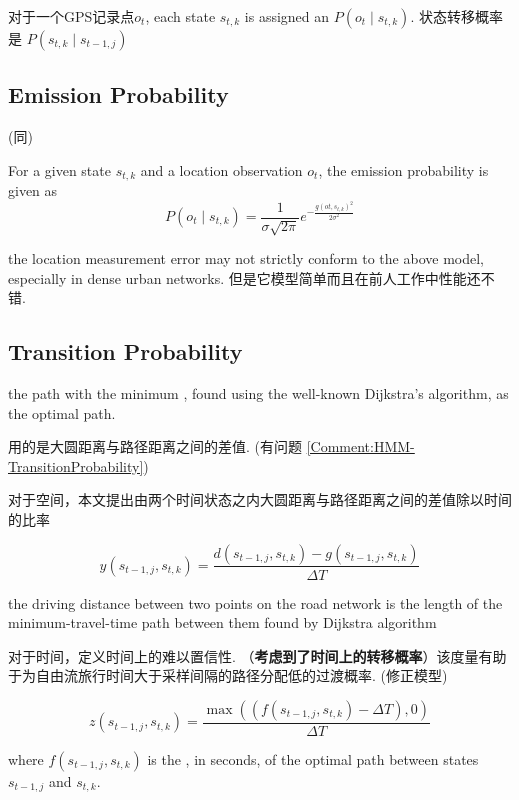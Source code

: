 对于一个GPS记录点$ o_{t} $, each state $ s_{t, k} $ is assigned an  $ P\left(o_{t} \mid s_{t, k}\right) $.  状态转移概率是 $ P\left(s_{t, k} \mid s_{t-1, j}\right) $

\subsection{Emission Probability}

(同\cite{newson2009hidden})

For a given state $ s_{t, k} $ and a location observation $ o_{t} $, the emission probability is given as
$$
P\left(o_{t} \mid s_{t, k}\right)=\frac{1}{\sigma \sqrt{2 \pi}} e^{-\frac{g\left(o t, s_{t, k}\right)^{2}}{2 \sigma^{2}}}
$$

\begin{remark}
    the location measurement error may not strictly conform to the above model, especially in dense urban networks. 但是它模型简单而且在前人工作中性能还不错. 
\end{remark}

\subsection{Transition Probability}

the path with the minimum , found using
the well-known Dijkstra's algorithm, as the optimal path.

\cite{newson2009hidden}用的是大圆距离与路径距离之间的差值. (有问题 \ref{Comment:HMM-TransitionProbability})

对于空间，本文提出由两个时间状态之内大圆距离与路径距离之间的差值除以时间的比率

$$ y\left(s_{t-1, j}, s_{t, k}\right)=\frac{d\left(s_{t-1, j}, s_{t, k}\right)-g\left(s_{t-1, j}, s_{t, k}\right)}{\Delta T} $$

the driving distance
between two points on the road network is the length of the
minimum-travel-time path between them found by Dijkstra
algorithm

对于时间，定义时间上的难以置信性. （\textbf{考虑到了时间上的转移概率}）该度量有助于为自由流旅行时间大于采样间隔的路径分配低的过渡概率. (修正模型)

$$
z\left(s_{t-1, j}, s_{t, k}\right)=\frac{\max \left(\left(f\left(s_{t-1, j}, s_{t, k}\right)-\Delta T\right), 0\right)}{\Delta T}
$$

where $ f\left(s_{t-1, j}, s_{t, k}\right) $ is the , in seconds, of the optimal path between states $ s_{t-1, j} $ and $ s_{t, k} $.


